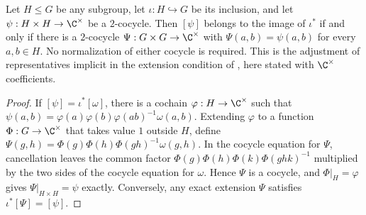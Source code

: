 \begin{lemma}
    \label{thm:mpug_h2_exact_extension}
    \leanok
    Let $H\le G$ be any subgroup, let $\iota:H\hookrightarrow G$ be its
    inclusion, and let $\psi:H\times H\to\C^\times$ be a $2$-cocycle.
    Then $[\psi]$ belongs to the image of $\iota^*$ if and only if there is
    a $2$-cocycle $\Psi:G\times G\to\C^\times$ with
    $\Psi(a,b)=\psi(a,b)$ for every $a,b\in H$.
    No normalization of either cocycle is required.
    This is the adjustment of representatives implicit in the extension
    condition of \cite[lines~7042--7064]{FrancoRubio2025MPUGauging},
    here stated with $\C^\times$ coefficients.
\end{lemma}

\begin{proof}\leanok
    If $[\psi]=\iota^*[\omega]$, there is a cochain
    $\varphi:H\to\C^\times$ such that
    $\psi(a,b)=\varphi(a)\varphi(b)\varphi(ab)^{-1}\omega(a,b)$.
    Extending $\varphi$ to a function $\Phi:G\to\C^\times$ that takes value $1$
    outside $H$, define
    $\Psi(g,h)=\Phi(g)\Phi(h)\Phi(gh)^{-1}\omega(g,h)$.
    In the cocycle equation for $\Psi$, cancellation leaves the common
    factor $\Phi(g)\Phi(h)\Phi(k)\Phi(ghk)^{-1}$ multiplied by the two sides
    of the cocycle equation for $\omega$. Hence $\Psi$ is a cocycle, and
    $\Phi|_H=\varphi$ gives $\Psi|_{H\times H}=\psi$ exactly.
    Conversely, any exact extension $\Psi$ satisfies
    $\iota^*[\Psi]=[\psi]$.
\end{proof}

